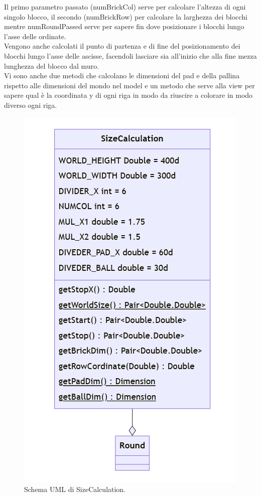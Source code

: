 \documentclass[a4paper,12pt]{report}
\begin{document}
Il primo parametro passato (numBrickCol) serve per calcolare l'altezza di ogni singolo blocco, il secondo (numBrickRow) per calcolare la larghezza dei blocchi
mentre numRoundPassed serve per sapere fin dove posizionare i blocchi lungo l'asse delle ordinate.
\\Vengono anche calcolati il punto di partenza e di fine del posizionamento dei blocchi lungo l'asse delle ascisse, facendoli lasciare sia all'inizio che alla fine mezza
lunghezza del blocco dal muro.
\\Vi sono anche due metodi che calcolano le dimensioni del pad e della pallina rispetto alle dimensioni del mondo nel model e un metodo che serve alla view per sapere qual è
la coordinata y di ogni riga in modo da riuscire a colorare in modo diverso ogni riga.
\begin{figure}[H]
    \centering{}
    \includegraphics[scale=0.5]{images/SizeCalculation.png}
    \caption{Schema UML di SizeCalculation.}
    \label{images:SizeCalculation}
\end{figure}
\end{document}
